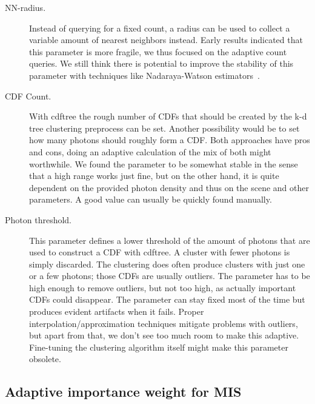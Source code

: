 \begin{description}
    \item[NN-radius.] Instead of querying for a fixed count, a radius can be used to collect a variable amount of nearest neighbors instead. Early results indicated that this parameter is more fragile, we thus focused on the adaptive count queries. We still think there is potential to improve the stability of this parameter with techniques like Nadaraya-Watson estimators~\cite{nadaraya1964estimating}.
    \item[CDF Count.] With cdftree the rough number of CDFs that should be created by the k-d tree clustering preprocess can be set. Another possibility would be to set how many photons should roughly form a CDF. Both approaches have pros and cons, doing an adaptive calculation of the mix of both might worthwhile. We found the parameter to be somewhat stable in the sense that a high range works just fine, but on the other hand, it is quite dependent on the provided photon density and thus on the scene and other parameters. A good value can usually be quickly found manually.
    \item[Photon threshold.] This parameter defines a lower threshold of the amount of photons that are used to construct a CDF with cdftree. A cluster with fewer photons is simply discarded. The clustering does often produce clusters with just one or a few photons; those CDFs are usually outliers. The parameter has to be high enough to remove outliers, but not too high, as actually important CDFs could disappear. The parameter can stay fixed most of the time but produces evident artifacts when it fails. Proper interpolation/approximation techniques mitigate problems with outliers, but apart from that, we don't see too much room to make this adaptive. Fine-tuning the clustering algorithm itself might make this parameter obsolete.
    
\end{description}

\subsection{Adaptive importance weight for MIS}
